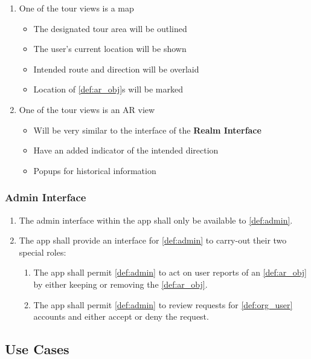 \documentclass{article}
\begin{document}
\begin{enumerate}[align=left, label=\textbf{TR-FR\arabic*:}]
\begin{enumerate}[align=left, label=\textbf{TR-FR4.\arabic*:}]
        \item One of the tour views is a map
        \begin{itemize}
            \item The designated tour area will be outlined
            \item The user’s current location will be shown
            \item Intended route and direction will be overlaid
            \item Location of \ref{def:ar_obj}s will be marked
        \end{itemize}
        \item One of the tour views is an AR view
        \begin{itemize}
            \item Will be very similar to the interface of the \textbf{Realm Interface}
            \item Have an added indicator of the intended direction
            \item Popups for historical information
        \end{itemize}
    \end{enumerate}
\end{enumerate}

\subsubsection{Admin Interface}
\label{ssub:admin_interface}

\begin{enumerate}[align=left, label=\textbf{AI-FR\arabic*:}]
    \item The admin interface within the app shall only be available to \ref{def:admin}.
    \item The app shall provide an interface for \ref{def:admin} to carry-out their two special roles:
    \begin{enumerate}[align=left, label=\textbf{AI-FR2.\arabic*:}]
        \item The app shall permit \ref{def:admin} to act on user reports of an \ref{def:ar_obj} by either keeping or removing the \ref{def:ar_obj}.
        \item The app shall permit \ref{def:admin} to review requests for \ref{def:org_user} accounts and either accept or deny the request.
    \end{enumerate}
\end{enumerate}

\subsection{Use Cases}
\label{sub:use_cases}
\end{document}

